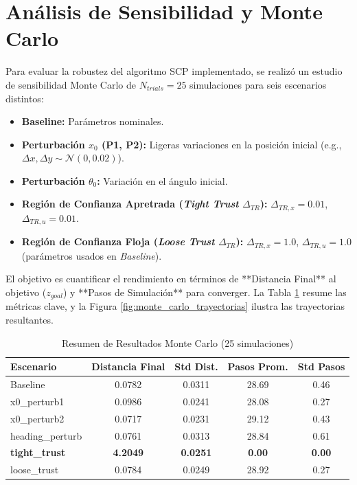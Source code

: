 \documentclass[conference]{IEEEtran}
\begin{document}
\section{Análisis de Sensibilidad y Monte Carlo}

Para evaluar la robustez del algoritmo SCP implementado, se realizó un estudio de sensibilidad Monte Carlo de $N_{trials}=25$ simulaciones para seis escenarios distintos:
\begin{itemize}
    \item \textbf{Baseline:} Parámetros nominales.
    \item \textbf{Perturbación $x_0$ (P1, P2):} Ligeras variaciones en la posición inicial (e.g., $\Delta x, \Delta y \sim \mathcal{N}(0, 0.02)$).
    \item \textbf{Perturbación $\theta_0$:} Variación en el ángulo inicial.
    \item \textbf{Región de Confianza Apretrada (\textit{Tight Trust} $\Delta_{TR}$):} $\Delta_{TR, x}=0.01$, $\Delta_{TR, u}=0.01$.
    \item \textbf{Región de Confianza Floja (\textit{Loose Trust} $\Delta_{TR}$):} $\Delta_{TR, x}=1.0$, $\Delta_{TR, u}=1.0$ (parámetros usados en \textit{Baseline}).
\end{itemize}

El objetivo es cuantificar el rendimiento en términos de **Distancia Final** al objetivo ($z_{goal}$) y **Pasos de Simulación** para converger. La Tabla \ref{tab:monte_carlo} resume las métricas clave, y la Figura \ref{fig:monte_carlo_trayectorias} ilustra las trayectorias resultantes.

\begin{table}[H]
\caption{Resumen de Resultados Monte Carlo (25 simulaciones)}
\begin{center}
\begin{tabular}{lcccc}
\toprule
\textbf{Escenario} & \textbf{Distancia Final} & \textbf{Std Dist.} & \textbf{Pasos Prom.} & \textbf{Std Pasos} \\
\midrule
Baseline & 0.0782 & 0.0311 & 28.69 & 0.46 \\
x0\_perturb1 & 0.0986 & 0.0241 & 28.08 & 0.27 \\
x0\_perturb2 & 0.0717 & 0.0231 & 29.12 & 0.43 \\
heading\_perturb & 0.0761 & 0.0313 & 28.84 & 0.61 \\
\textbf{tight\_trust} & \textbf{4.2049} & \textbf{0.0251} & \textbf{0.00} & \textbf{0.00} \\
loose\_trust & 0.0784 & 0.0249 & 28.92 & 0.27 \\
\bottomrule
\end{tabular}
\label{tab:monte_carlo}
\end{center}
\end{table}
\end{document}
